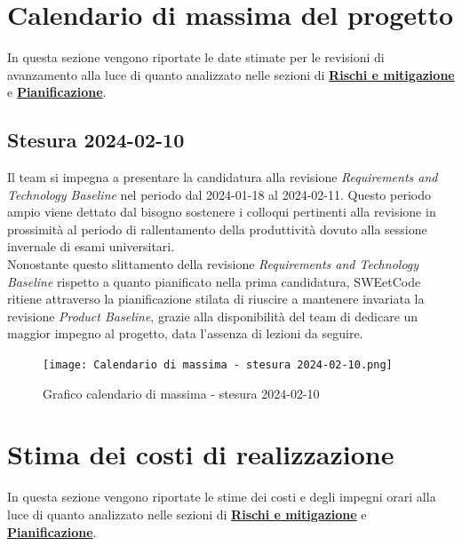 \documentclass[10pt, a4paper]{article}
\begin{document}
\newpage
\section{Calendario di massima del progetto}
In questa sezione vengono riportate le date stimate per le revisioni di avanzamento alla luce di quanto analizzato nelle sezioni di \hyperref[section:Rischi]{\textbf{Rischi e mitigazione}} e \hyperref[section:Pianificazione]{\textbf{Pianificazione}}.

\subsection{Stesura 2024-02-10}
Il team si impegna a presentare la candidatura alla revisione \textit{Requirements and Technology Baseline\pg} nel periodo dal 2024-01-18 al 2024-02-11. Questo periodo ampio viene dettato dal bisogno sostenere i colloqui pertinenti alla revisione in prossimità al periodo di rallentamento della produttività dovuto alla sessione invernale di esami universitari. \\
Nonostante questo slittamento della revisione \textit{Requirements and Technology Baseline} rispetto a quanto pianificato nella prima candidatura, SWEetCode ritiene attraverso la pianificazione stilata di riuscire a mantenere invariata la revisione \textit{Product Baseline\pg}, grazie alla disponibilità del team di dedicare un maggior impegno al progetto, data l'assenza di lezioni da seguire.
 \begin{figure}[H]
        \centering
        \texttt{[image: Calendario di massima - stesura 2024-02-10.png]}
        \caption{Grafico calendario di massima - stesura 2024-02-10}
    \end{figure}

\section{Stima dei costi di realizzazione}
In questa sezione vengono riportate le stime dei costi e degli impegni orari alla luce di quanto analizzato nelle sezioni di \hyperref[section:Rischi]{\textbf{Rischi e mitigazione}} e \hyperref[section:Pianificazione]{\textbf{Pianificazione}}.
\end{document}
